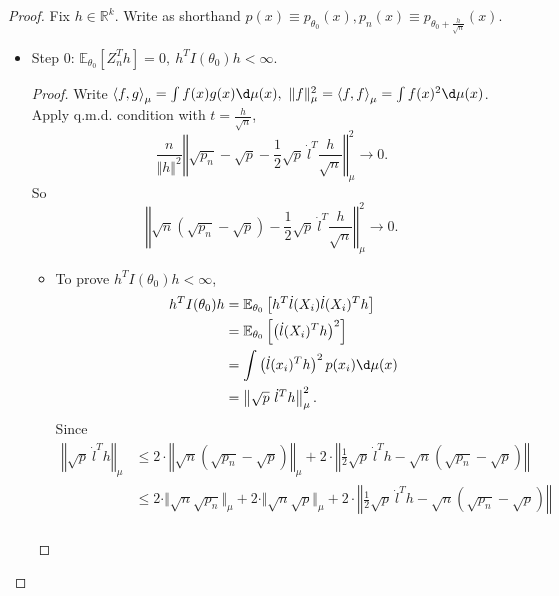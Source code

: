 \documentclass[a4paper]{article}
\begin{document}
\begin{proof}
	Fix $h \in \mathbb{R}^k$. Write as shorthand $p(x) \equiv p_{\theta_0}(x), p_n(x) \equiv p_{\theta_0 + \frac{h}{\sqrt{n}}} (x)$.
	\begin{itemize}[leftmargin=*]
		\item Step 0: $\mathbb{E}_{\theta_0} \left[Z_n^T h\right] = 0, \ h^TI(\theta_0)h < \infty$.
		\begin{proof}
			Write $\left\langle f,g \right\rangle_{\mu} = \int f(x)g(x) \d \mu (x), \ \Vert f \Vert^2_{\mu} = \left\langle f,f \right\rangle_{\mu} = \int f(x)^2 \d \mu (x)$. Apply q.m.d. condition with $t = \frac{h}{\sqrt{n}}$,
			\begin{equation*}
				\frac{n}{\Vert h \Vert^2} \left\Vert \sqrt{p_n} - \sqrt{p} - \frac{1}{2} \sqrt{p} \ \dot{l}^T \frac{h}{\sqrt{n}}\right\Vert_{\mu}^2 \to 0.
			\end{equation*}
			So
			\begin{equation*}
				\left\Vert \sqrt{n} \left(\sqrt{p_n} - \sqrt{p}\right) - \frac{1}{2} \sqrt{p} \ \dot{l}^T \frac{h}{\sqrt{n}}\right\Vert_{\mu}^2 \to 0.
			\end{equation*}
			\begin{itemize}
				\item To prove $h^T I(\theta_0) h < \infty$,
				\begin{equation*}
					\begin{aligned}
						h^T I(\theta_0) h &= \mathbb{E}_{\theta_0} \left[h^T \dot{l}(X_i) \dot{l}(X_i)^T h\right] \\
						&= \mathbb{E}_{\theta_0} \left[ \left(\dot{l}(X_i)^T h\right)^2 \right] \\
						&= \int \left(\dot{l}(x_i)^T h\right)^2 p(x_i) \d \mu (x) \\
						&= \left\Vert \sqrt{p} \ \dot{l}^T h\right\Vert_{\mu}^2.
					\end{aligned}
				\end{equation*}
				Since
				\begin{equation*}
					\begin{aligned}
						\left\Vert \sqrt{p} \ \dot{l}^T h\right\Vert_{\mu} &\leq 2 \cdot \left\Vert \sqrt{n} \left(\sqrt{p_n} - \sqrt{p}\right) \right\Vert_{\mu} + 2 \cdot \left\Vert \frac{1}{2}\sqrt{p} \ \dot{l}^T h -\sqrt{n} \left(\sqrt{p_n} - \sqrt{p}\right)\right\Vert \\
						&\leq 2 \cdot \Vert \sqrt{n} \sqrt{p_n} \Vert_{\mu} + 2 \cdot \Vert \sqrt{n} \sqrt{p} \Vert_{\mu} + 2 \cdot \left\Vert \frac{1}{2}\sqrt{p} \ \dot{l}^T h -\sqrt{n} \left(\sqrt{p_n} - \sqrt{p}\right)\right\Vert \\

\end{aligned}
\end{equation*}
\end{itemize}
\end{proof}
\end{itemize}
\end{proof}
\end{document}
